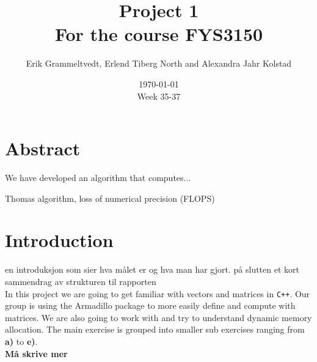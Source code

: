 \documentclass{article}
\begin{document}
\addtocounter{page}{0}

\title{Project 1 \\
      \large For the course FYS3150}
\date{\today \\
    \vspace{1mm}
    \large Week 35-37}

\author{Erik Grammeltvedt, Erlend Tiberg North and Alexandra Jahr Kolstad}

\maketitle

\vspace{1cm}

\tableofcontents



\section{Abstract}


We have developed an algorithm that computes...

Thomas algorithm, loss of numerical precision (FLOPS)


\vspace{1cm}

\section{Introduction}

en introduksjon som sier hva målet er og hva man har gjort. på slutten et kort sammendrag av strukturen til rapporten \\

In this project we are going to get familiar with vectors and matrices in \texttt{C++}. Our group is using the Armadillo package to more easily define and compute with matrices. We are also going to work with and try to understand dynamic memory allocation. The main exercise is grouped into smaller sub exercises ranging from \textbf{a)} to \textbf{e)}. \\

\textbf{Må skrive mer}


\vspace{1cm}
\end{document}

